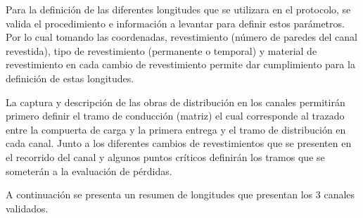 \documentclass[]{article}
\begin{document}
Para la definición de las diferentes longitudes que se utilizara en el protocolo, se valida el procedimiento e información a levantar para definir estos parámetros. Por lo cual tomando las coordenadas, revestimiento (número de paredes del canal revestida), tipo de revestimiento (permanente o temporal) y material de revestimiento en cada cambio de revestimiento permite dar cumplimiento para la definición de estas longitudes.

La captura y descripción de las obras de distribución en los canales permitirán primero definir el tramo de conducción (matriz) el cual corresponde al trazado entre la compuerta de carga y la primera entrega y el tramo de distribución en cada canal. Junto a los diferentes cambios de revestimientos que se presenten en el recorrido del canal y algunos puntos críticos definirán los tramos que se someterán a la evaluación de pérdidas. 

A continuación se presenta un resumen de longitudes que presentan los 3 canales validados.

\begin{table}[H]
\centering
\caption{Longitudes por canal}
\label{my-label}
\end{table}
\end{document}
